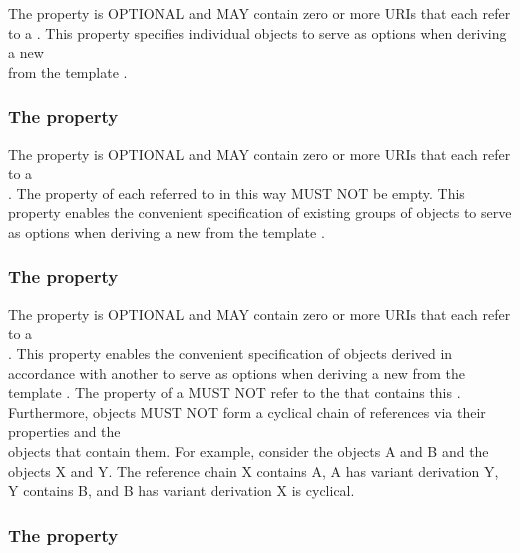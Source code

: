 The  property is OPTIONAL and MAY contain zero or more URIs that each refer to a . This property specifies individual  objects to serve as options when deriving a new\\
 from the template .

\subsubsection*{ The  property}\label{sec:variantCollections}

The  property is OPTIONAL and MAY contain zero or more URIs that each refer to a\\
. The  property of each  referred to in this way MUST NOT be empty. This property enables the convenient specification of existing groups of  objects to serve as options when deriving a new  from the template .

\subsubsection*{ The  property}\label{sec:variantDerivations}

The  property is OPTIONAL and MAY contain zero or more URIs that each refer to a\\ . This property enables the convenient specification of  objects derived in accordance with another  to serve as options when deriving a new  from the template . The  property of a  MUST NOT refer to the  that contains this . Furthermore,  objects MUST NOT form a cyclical chain of references via their  properties and the\\  objects that contain them. For example, consider the  objects A and B and the  objects X and Y. The reference chain X contains A, A has variant derivation Y, Y contains B, and B has variant derivation X is cyclical.

\subsubsection*{ The  property}\label{sec:operator}

